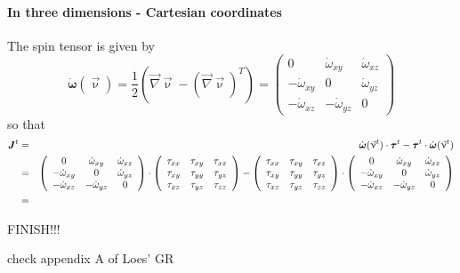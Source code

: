 \paragraph{In three dimensions - Cartesian coordinates}
The spin tensor is given by 
\[
\dot{\bm \omega}(\vec\upnu) 
= \frac{1}{2}\left( \vec\nabla\vec \upnu - (\vec\nabla \vec\upnu)^T \right)
= 
\left( \begin{array}{ccc}
0 & \dot{\omega}_{xy} & \dot{\omega}_{xz}\\
-\dot{\omega}_{xy} & 0 & \dot{\omega}_{yz} \\
-\dot{\omega}_{xz} & -\dot{\omega}_{yz} & 0
\end{array}\right)
\]
so that 
\begin{eqnarray}
{\bm J}^t 
&=& \dot{\bm \omega}(\vec\upnu^t) \cdot {\bm \tau}^t - {\bm \tau}^t \cdot \dot{\bm \omega}(\vec\upnu^t)  \nonumber\\
&=&
\left( \begin{array}{ccc}
0 & \dot{\omega}_{xy} & \dot{\omega}_{xz}\\
-\dot{\omega}_{xy} & 0 & \dot{\omega}_{yz} \\
-\dot{\omega}_{xz} & -\dot{\omega}_{yz} & 0
\end{array}\right)
\cdot
\left( \begin{array}{ccc}
\tau_{xx} & \tau_{xy} & \tau_{xz}\\
\tau_{xy} & \tau_{yy} & \tau_{yz}\\
\tau_{xz} & \tau_{yz} & \tau_{zz}
\end{array}\right)
-
\left( \begin{array}{ccc}
\tau_{xx} & \tau_{xy} & \tau_{xz}\\
\tau_{xy} & \tau_{yy} & \tau_{yz}\\
\tau_{xz} & \tau_{yz} & \tau_{zz}
\end{array}\right)
\cdot
\left( \begin{array}{ccc}
0 & \dot{\omega}_{xy} & \dot{\omega}_{xz}\\
-\dot{\omega}_{xy} & 0 & \dot{\omega}_{yz} \\
-\dot{\omega}_{xz} & -\dot{\omega}_{yz} & 0
\end{array}\right)
\nonumber\\
&=&
\end{eqnarray}

FINISH!!!


check appendix A of Loes' GR





